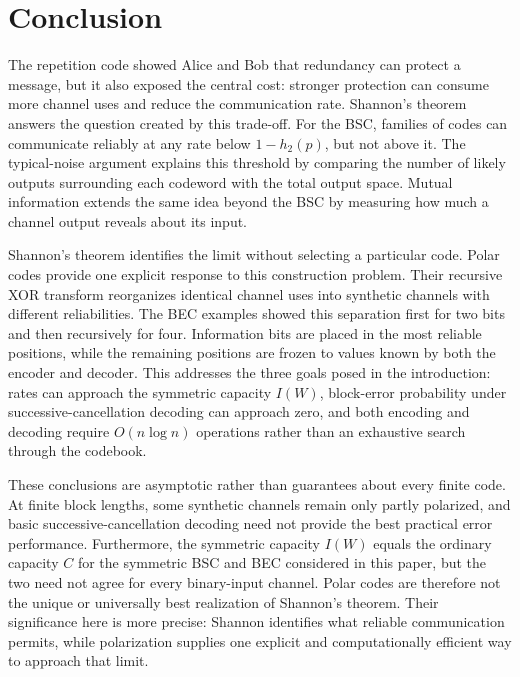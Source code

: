 \section{Conclusion}

The repetition code showed Alice and Bob that redundancy can protect a message, but it also exposed the central cost: stronger protection can consume more channel uses and reduce the communication rate. Shannon's theorem answers the question created by this trade-off. For the BSC, families of codes can communicate reliably at any rate below $1-h_2(p)$, but not above it. The typical-noise argument explains this threshold by comparing the number of likely outputs surrounding each codeword with the total output space. Mutual information extends the same idea beyond the BSC by measuring how much a channel output reveals about its input.

Shannon's theorem identifies the limit without selecting a particular code. Polar codes provide one explicit response to this construction problem. Their recursive XOR transform reorganizes identical channel uses into synthetic channels with different reliabilities. The BEC examples showed this separation first for two bits and then recursively for four. Information bits are placed in the most reliable positions, while the remaining positions are frozen to values known by both the encoder and decoder. This addresses the three goals posed in the introduction: rates can approach the symmetric capacity $I(W)$, block-error probability under successive-cancellation decoding can approach zero, and both encoding and decoding require $O(n\log n)$ operations rather than an exhaustive search through the codebook.

These conclusions are asymptotic rather than guarantees about every finite code. At finite block lengths, some synthetic channels remain only partly polarized, and basic successive-cancellation decoding need not provide the best practical error performance. Furthermore, the symmetric capacity $I(W)$ equals the ordinary capacity $C$ for the symmetric BSC and BEC considered in this paper, but the two need not agree for every binary-input channel. Polar codes are therefore not the unique or universally best realization of Shannon's theorem. Their significance here is more precise: Shannon identifies what reliable communication permits, while polarization supplies one explicit and computationally efficient way to approach that limit.


